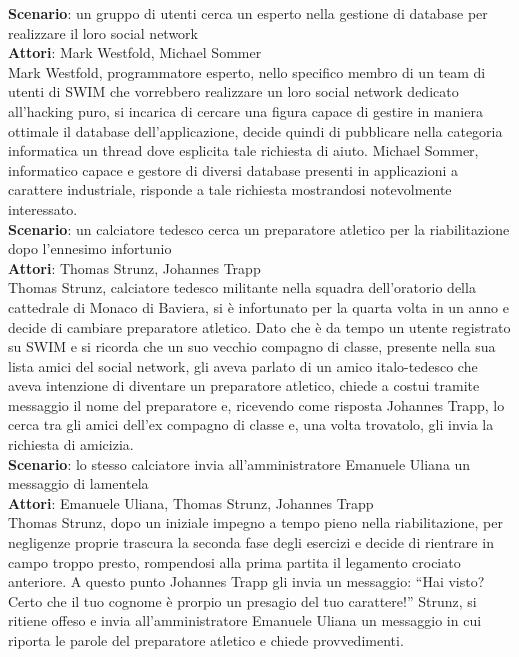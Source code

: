 \documentclass[a4paper,12pt]{article}
\begin{document}
\textbf{Scenario}: un gruppo di utenti cerca un esperto nella gestione di database per realizzare il loro social network \\
\textbf{Attori}: Mark Westfold, Michael Sommer \\
Mark Westfold, programmatore esperto, nello specifico membro di un team di utenti di SWIM che vorrebbero realizzare un loro social network dedicato all'hacking puro, si incarica di cercare una figura capace di gestire in maniera ottimale il database dell'applicazione, decide quindi di pubblicare nella categoria informatica un thread dove esplicita tale richiesta di aiuto. Michael Sommer, informatico capace e gestore di diversi database presenti in applicazioni a carattere industriale, risponde a tale richiesta mostrandosi notevolmente interessato.    \\[3em]
\textbf{Scenario}: un calciatore tedesco cerca un preparatore atletico per la riabilitazione dopo l'ennesimo infortunio \\
\textbf{Attori}: Thomas Strunz, Johannes Trapp \\
Thomas Strunz, calciatore tedesco militante nella squadra dell'oratorio della cattedrale di Monaco di Baviera, si è infortunato per la quarta volta in un anno e decide di cambiare preparatore atletico. Dato che è da tempo un utente registrato su SWIM e si ricorda che un suo vecchio compagno di classe, presente nella sua lista amici del social network, gli aveva parlato di un amico italo-tedesco che aveva intenzione di diventare un preparatore atletico, chiede a costui tramite messaggio il nome del preparatore e, ricevendo come risposta Johannes Trapp, lo cerca tra gli amici dell'ex compagno di classe e, una volta trovatolo, gli invia la richiesta di amicizia. \\[1.5em]
\textbf{Scenario}: lo stesso calciatore invia all'amministratore Emanuele Uliana un messaggio di lamentela \\
\textbf{Attori}: Emanuele Uliana, Thomas Strunz, Johannes Trapp \\
Thomas Strunz, dopo un iniziale impegno a tempo pieno nella riabilitazione, per negligenze proprie trascura la seconda fase degli esercizi e decide di rientrare in campo troppo presto, rompendosi alla prima partita il legamento crociato anteriore. A questo punto Johannes Trapp gli invia un messaggio: “Hai visto? Certo che il tuo cognome è prorpio un presagio del tuo carattere!” Strunz, si ritiene offeso e invia all'amministratore Emanuele Uliana un messaggio in cui riporta le parole del preparatore atletico e chiede provvedimenti. \\[1.5em]
\end{document}
